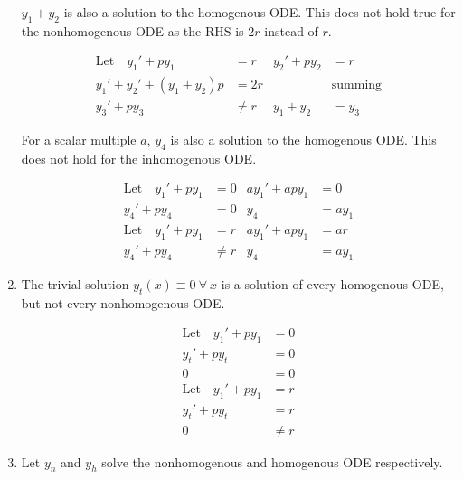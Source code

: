 \begin{enumerate}
          $ y_{1} + y_{2} $ is also a solution to the homogenous ODE. This does not hold true
          for the nonhomogenous ODE as the RHS is $ 2r $ instead of $ r $.

          \begin{align}
              \text{Let} \quad y_{1}' + py_{1}   & = r    & y_{2}' + py_{2} & = r            \\
              y_{1}' + y_{2}' + (y_{1} + y_{2})p & = 2r   &                 & \text{summing} \\
              y_{3}' + py_{3}                    & \neq r & y_{1} + y_{2}   & = y_{3}
          \end{align}


          For a scalar multiple $ a $, $ y_{4} $ is also a solution to the homogenous ODE.
          This does not hold for the inhomogenous ODE.

          \begin{align}
              \text{Let} \quad y_{1}' + py_{1} & = 0    & ay_{1}' + apy_{1} & = 0      \\
              y_{4}' + py_{4}                  & = 0    & y_{4}             & = ay_{1} \\
              \text{Let} \quad y_{1}' + py_{1} & = r    & ay_{1}' + apy_{1} & = ar     \\
              y_{4}' + py_{4}                  & \neq r & y_{4}             & = ay_{1}
          \end{align}


    \item The trivial solution $ y_{t}(x) \equiv 0\ \forall\ x$ is a solution of every homogenous
          ODE, but not every nonhomogenous ODE.

          \begin{align}
              \text{Let} \quad y_{1}' + py_{1} & = 0    \\
              y_{t}' + py_{t}                  & = 0    \\
              0                                & = 0    \\
              \text{Let} \quad y_{1}' + py_{1} & = r    \\
              y_{t}' + py_{t}                  & = r    \\
              0                                & \neq r
          \end{align}


    \item Let $ y_{n} $ and $ y_{h} $ solve the nonhomogenous and homogenous ODE
          respectively.


\end{enumerate}
